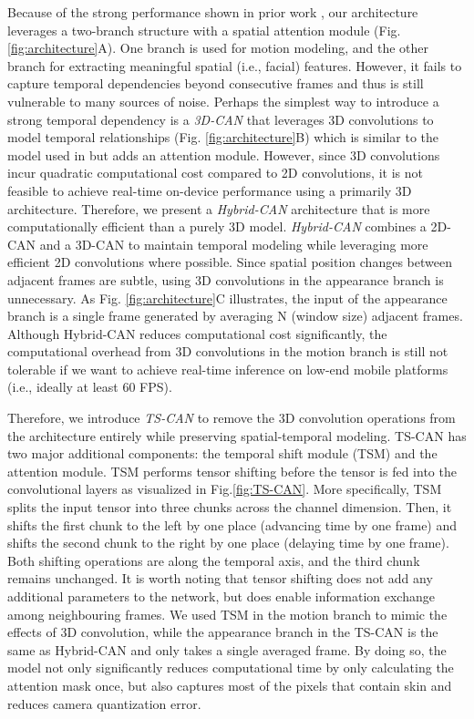 \documentclass{article}
\begin{document}
Because of the strong performance shown in prior work \citep{chen2018deepphys}, our architecture leverages a two-branch structure with a spatial attention module (Fig. \ref{fig:architecture}A). One branch is used for motion modeling, and the other branch for extracting meaningful spatial (i.e., facial) features. However, it fails to capture temporal dependencies beyond consecutive frames and thus is still vulnerable to many sources of noise. Perhaps the simplest way to introduce a strong temporal dependency is a \textit{3D-CAN} that leverages 3D convolutions to model temporal relationships (Fig. \ref{fig:architecture}B) which is similar to the model used in \cite{yu2019remote} but adds an attention module. However, since 3D convolutions incur quadratic computational cost compared to 2D convolutions, it is not feasible to achieve real-time on-device performance using a primarily 3D architecture. Therefore, we present a \textit{Hybrid-CAN} architecture that is more computationally efficient than a purely 3D model. \textit{Hybrid-CAN} combines a 2D-CAN and a 3D-CAN to maintain temporal modeling while leveraging more efficient 2D convolutions where possible. Since spatial position changes between adjacent frames are subtle, using 3D convolutions in the appearance branch is unnecessary. As Fig. \ref{fig:architecture}C illustrates, the input of the appearance branch is a single frame generated by averaging N (window size) adjacent frames. Although Hybrid-CAN reduces computational cost significantly, the computational overhead from 3D convolutions in the motion branch is still not tolerable if we want to achieve real-time inference on low-end mobile platforms (i.e., ideally at least 60 FPS).  

Therefore, we introduce \textit{TS-CAN} to remove the 3D convolution operations from the architecture entirely while preserving spatial-temporal modeling. TS-CAN has two major additional components: the temporal shift module (TSM) \citep{lin2019tsm} and the attention module. TSM performs tensor shifting before the tensor is fed into the convolutional layers as visualized in Fig.\ref{fig:TS-CAN}. More specifically, TSM splits the input tensor into three chunks across the channel dimension. Then, it shifts the first chunk to the left by one place (advancing time by one frame) and shifts the second chunk to the right by one place (delaying time by one frame). Both shifting operations are along the temporal axis, and the third chunk remains unchanged. It is worth noting that tensor shifting does not add any additional parameters to the network, but does enable information exchange among neighbouring frames. We used TSM in the motion branch to mimic the effects of 3D convolution, while the appearance branch in the TS-CAN is the same as Hybrid-CAN and only takes a single averaged frame. By doing so, the model not only significantly reduces computational time by only calculating the attention mask once, but also captures most of the pixels that contain skin and reduces camera quantization error. 
\end{document}
